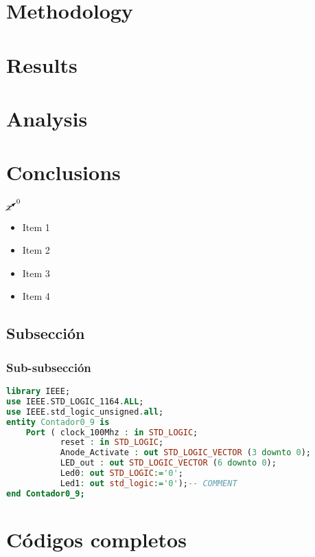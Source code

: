 \documentclass[12pt]{article}  %
\begin{document}
\section{Methodology} %
\section{Results} %
\section{Analysis} %
\section{Conclusions} %
\cite{gh1562} %

$\cancelto{0}{x}$ %
\begin{itemize}
    \item Item 1
    \item Item 2
    \item Item 3
    \item Item 4
\end{itemize}

\subsection{Subsección}
\cite{Agarwal2019} %
\subsubsection{Sub-subsección}


\newpage

\begin{lstlisting}[language=VHDL, caption=Código en VHDL]
  library IEEE;
use IEEE.STD_LOGIC_1164.ALL;
use IEEE.std_logic_unsigned.all;
entity Contador0_9 is
    Port ( clock_100Mhz : in STD_LOGIC;
           reset : in STD_LOGIC;
           Anode_Activate : out STD_LOGIC_VECTOR (3 downto 0);
           LED_out : out STD_LOGIC_VECTOR (6 downto 0);
           Led0: out STD_LOGIC:='0';
           Led1: out std_logic:='0');-- COMMENT
end Contador0_9;
\end{lstlisting}

\newpage %
\appendix %
\section{Códigos completos}


\clearpage %
\end{document}

